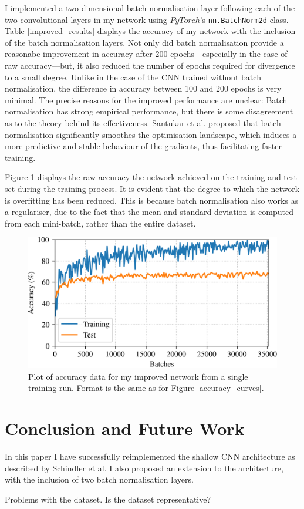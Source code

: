 \documentclass[conference]{IEEEtran}
\begin{document}
I implemented a two-dimensional batch normalisation layer following each of the two convolutional layers in my network using $PyTorch$'s \texttt{nn.BatchNorm2d} class.
Table \ref{improved_results} displays the accuracy of my network with the inclusion of the batch normalisation layers.
Not only did batch normalisation provide a reasonabe improvement in accuracy after 200 epochs---especially in the case of raw accuracy---but, it also reduced the number of epochs required for divergence to a small degree.
Unlike in the case of the CNN trained without batch normalisation, the difference in accuracy between 100 and 200 epochs is very minimal.
The precise reasons for the improved performance are unclear: Batch normalisation has strong empirical performance, but there is some disagreement as to the theory behind its effectiveness.
Santukar et al. \cite{SanturkarEtAl} proposed that batch normalisation significantly smoothes the optimisation landscape, which induces a more predictive and stable behaviour of the gradients, thus facilitating faster training.

Figure \ref{accuracy_curves_improved} displays the raw accuracy the network achieved on the training and test set during the training process.
It is evident that the degree to which the network is overfitting has been reduced.
This is because batch normalisation also works as a regulariser, due to the fact that the mean and standard deviation is computed from each mini-batch, rather than the entire dataset.

\begin{figure}[htbp]
    \centerline{\includegraphics[width=\columnwidth]{accuracy_improved.png}}
    \caption{
        Plot of accuracy data for my improved network from a single training run.
        Format is the same as for Figure \ref{accuracy_curves}.
    }
    \label{accuracy_curves_improved}
\end{figure}

\section{Conclusion and Future Work}

In this paper I have successfully reimplemented the shallow CNN architecture as described by Schindler et al.
I also proposed an extension to the architecture, with the inclusion of two batch normalisation layers.

Problems with the dataset. Is the dataset representative?



\end{document}
